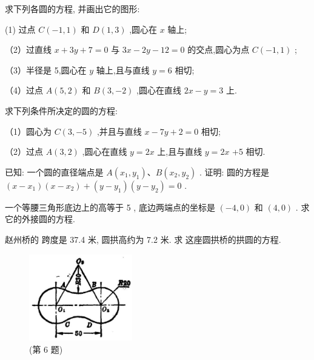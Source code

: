 \documentclass[lang=cn,newtx,10pt,scheme=chinese]{elegantbook}
\begin{document}
\begin{problemset}[习 题 五]

\item 求下列各圆的方程, 并画出它的图形:

(1) 过点 \(C\left( {-1,1}\right)\) 和 \(D\left( {1,3}\right)\) ,圆心在 \(x\) 轴上;

（2）过直线 \(x + {3y} + 7 = 0\) 与 \({3x} - {2y} - {12} = 0\) 的交点,圆心为点 \(C\left( {-1,1}\right)\) ;

（3）半径是 5,圆心在 \(y\) 轴上,且与直线 \(y = 6\) 相切;

（4）过点 \(A\left( {5,2}\right)\) 和 \(B\left( {3, - 2}\right)\) ,圆心在直线 \({2x} - y = 3\) 上.

\item 求下列条件所决定的圆的方程:

（1）圆心为 \(C\left( {3, - 5}\right)\) ,并且与直线 \(x - {7y} + 2 = 0\) 相切;

（2）过点 \(A\left( {3,2}\right)\) ,圆心在直线 \(y = {2x}\) 上,且与直线 \(y = {2x}\) +5 相切.

\item 已知: 一个圆的直径端点是 \(A\left( {{x}_{1},{y}_{1}}\right) \text{、}B\left( {{x}_{2},{y}_{2}}\right)\) . 证明: 圆的方程是 \(\left( {x - {x}_{1}}\right) \left( {x - {x}_{2}}\right) + \left( {y - {y}_{1}}\right) \left( {y - {y}_{2}}\right) = 0\) .

\item 一个等腰三角形底边上的高等于 5 , 底边两端点的坐标是 \(\left( {-4,0}\right)\) 和 \(\left( {4,0}\right)\) . 求它的外接圆的方程.

\item 赵州桥的 跨度是 37.4 米, 圆拱高约为 7.2 米. 求 这座圆拱桥的拱圆的方程.

\begin{figure}[h]
  \centering
  \includegraphics[max width=0.4\textwidth]{images/01912cc2-ffb6-728e-9ae7-b113ff05c64b_85_663180.jpg}
  \caption{(第 6 题)}
\end{figure}




\end{problemset}
\end{document}
